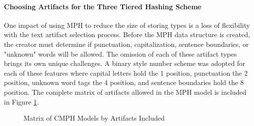 		\paragraph{Choosing Artifacts for the Three Tiered Hashing Scheme} One impact of using MPH to reduce the size of storing types is a loss of flexibility with the text artifact selection process.  Before the MPH data structure is created, the creator must determine if punctuation, capitalization, sentence boundaries, or "unknown" words will be allowed.  The omission of each of these artifact types brings its own unique challenges. A binary style number scheme was adopted for each of these features where capital letters hold the 1 position, punctuation the 2 position, unknown word tags the 4 position, and sentence boundaries hold the 8 position.  The complete matrix of artifacts allowed in the MPH model is included in Figure \ref{fig:cmphMatrix}.
		
		\begin{figure}[h!]
			\begin{center}
				\caption{Matrix of CMPH Models by Artifacts Included}
				\label{fig:cmphMatrix}
			\end{center}
		\end{figure}
		
